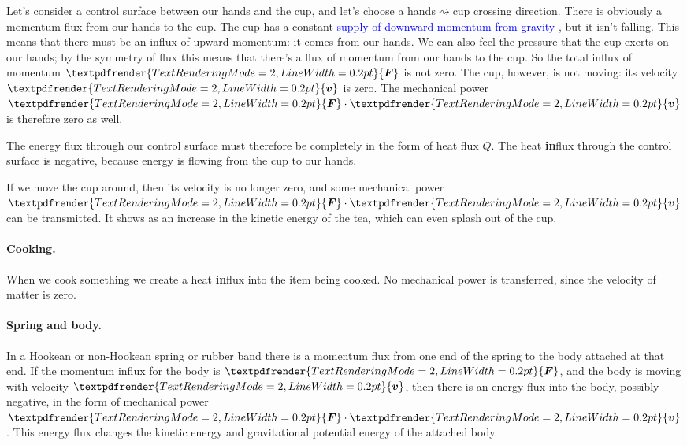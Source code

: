 \documentclass[a4paper,12pt,%
onecolumn,oneside,%
british%
]{memoir}
\providecommand{\href}[2]{#2}
\renewcommand*{\bm}[1]{\textpdfrender{TextRenderingMode=2,LineWidth=0.2pt}{\boldsymbol{#1}}}
\renewcommand*{\|}[1][]{\nonscript\:#1\vert\nonscript\:\mathopen{}}
\newcommand*{\sect}{\S}%
\newcommand*{\furl}[2]{\href{#1}{#2}\pagenote{\url{#1}}}
\renewcommand*{\autoref}[3][\sect\,\ref]{\textcolor{blue}{#3}
\raisebox{0.6ex}{\color{blue}\miniscule%
\faIcon{angle-right}%
\;#1{#2}\;p.\,\pageref{#2}}}
\newcommand*{\yv}{\bm{v}}
\newcommand*{\yQ}{Q}%
\newcommand*{\yF}{\bm{F}}
\begin{document}
%
Let's consider a control surface between our hands and the cup, and let's choose a hands${}\rightsquigarrow{}$cup crossing direction.
There is obviously a momentum flux from our hands to the cup. The cup has a constant \autoref{def:gravity_surface}{supply of downward momentum from gravity}, but it isn't falling. This means that there must be an influx of upward momentum: it comes from our hands. We can also feel the pressure that the cup exerts on our hands; by the symmetry of flux this means that there's a flux of momentum from our hands to the cup. So the total influx of momentum $\yF$ is not zero. The cup, however, is not moving: its velocity $\yv$ is zero. The mechanical power $\yF\cdot \yv$ is therefore zero as well.

The energy flux through our control surface must therefore be completely in the form of heat flux $\yQ$. The heat \textbf{in}flux through the control surface is negative, because energy is flowing from the cup to our hands.

If we move the cup around, then its velocity is no longer zero, and some mechanical power $\yF\cdot\yv$ can be transmitted. It shows as an increase in the kinetic energy of the tea, which can even splash out of the cup.

\paragraph{Cooking.}
When we cook something we create a heat \textbf{in}flux into the item being cooked. No mechanical power is transferred, since the velocity of matter is zero.

\paragraph{Spring and body.}
In a Hookean or non-Hookean spring or rubber band there is a momentum flux from one end of the spring to the body attached at that end. If the momentum influx for the body is $\yF$, and the body is moving with velocity $\yv$, then there is an energy flux into the body, possibly negative, in the form of mechanical power $\yF\cdot \yv$. This energy flux changes the kinetic energy and gravitational potential energy of the attached body.
\end{document}
